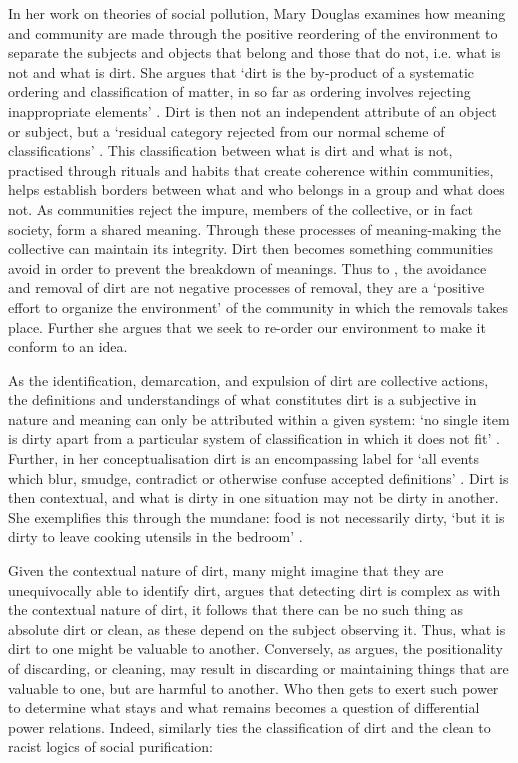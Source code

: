 In her work on theories of social pollution, Mary Douglas \citeyear{Douglas:1966} examines how meaning and community are made through the positive reordering of the environment to separate the subjects and objects that belong and those that do not, i.e. what is not and what is dirt. She argues that `dirt is the by-product of a systematic ordering and classification of matter, in so far as ordering involves rejecting inappropriate elements' \cite{Douglas:1966}. Dirt is then not an independent attribute of an object or subject, but a `residual category rejected from our normal scheme of classifications' \cite{Douglas:1966}. This classification between what is dirt and what is not, practised through rituals and habits that create coherence within communities, helps establish borders between what and who belongs in a group and what does not. As communities reject the impure, members of the collective, or in fact society, form a shared meaning. Through these processes of meaning-making the collective can maintain its integrity. Dirt then becomes something communities avoid in order to prevent the breakdown of meanings. Thus to \citet{Douglas:1966}, the avoidance and removal of dirt are not negative processes of removal, they are a `positive effort to organize the environment' \cite{Douglas:1966} of the community in which the removals takes place. Further she argues that we seek to re-order our environment to make it conform to an idea.

As the identification, demarcation, and expulsion of dirt are collective actions, the definitions and understandings of what constitutes dirt is a subjective in nature and meaning can only be attributed within a given system: `no single item is dirty apart from a particular system of classification in which it does not fit' \cite{Douglas:1966}. Further, in her conceptualisation dirt is an encompassing label for `all events which blur, smudge, contradict or otherwise confuse accepted definitions' \cite{Douglas:1966}. Dirt is then contextual, and what is dirty in one situation may not be dirty in another. She exemplifies this through the mundane: food is not necessarily dirty, `but it is dirty to leave cooking utensils in the bedroom' \cite{Douglas:1966}.

Given the contextual nature of dirt, many might imagine that they are unequivocally able to identify dirt, \citet{Douglas:1966} argues that detecting dirt is complex as with the contextual nature of dirt, it follows that there can be no such thing as absolute dirt or clean, as these depend on the subject observing it. Thus, what is dirt to one might be valuable to another. Conversely, as \citet{Lepawsky:2019} argues, the positionality of discarding, or cleaning, may result in discarding or maintaining things that are valuable to one, but are harmful to another. Who then gets to exert such power to determine what stays and what remains becomes a question of differential power relations. Indeed, \cite{Hall:1993} similarly ties the classification of dirt and the clean to racist logics of social purification:

